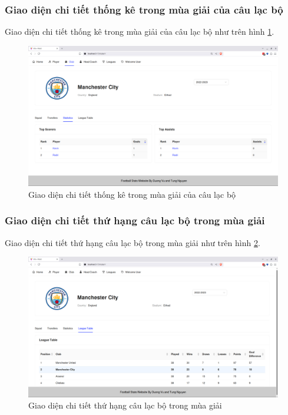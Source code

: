 \documentclass[../BTL.tex]{subfiles}
\begin{document}
\subsubsection{Giao diện chi tiết thống kê trong mùa giải của câu lạc bộ}
Giao diện chi tiết thống kê trong mùa giải của câu lạc bộ như trên hình \ref{fig:user-club-detail-statistic}.
\begin{figure}
\centering
\includegraphics[width=1\linewidth]{Hinhve/user-club-detail-statistic.png}
\caption{Giao diện chi tiết thống kê trong mùa giải của câu lạc bộ}
\label{fig:user-club-detail-statistic}
\end{figure}

\subsubsection{Giao diện chi tiết thứ hạng câu lạc bộ trong mùa giải}
Giao diện chi tiết thứ hạng câu lạc bộ trong mùa giải như trên hình \ref{fig:user-club-detail-league-table}.
\begin{figure}
\centering
\includegraphics[width=1\linewidth]{Hinhve/user-club-detail-league-table.png}
\caption{Giao diện chi tiết thứ hạng câu lạc bộ trong mùa giải}
\label{fig:user-club-detail-league-table}
\end{figure}
\end{document}
